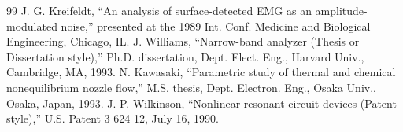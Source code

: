 \documentclass[letterpaper, 10 pt, conference]{ieeeconf}  %
\begin{document}
\begin{thebibliography}{99}
 J. G. Kreifeldt, “An analysis of surface-detected EMG as an amplitude-modulated noise,” presented at the 1989 Int. Conf. Medicine and Biological Engineering, Chicago, IL.
 J. Williams, “Narrow-band analyzer (Thesis or Dissertation style),” Ph.D. dissertation, Dept. Elect. Eng., Harvard Univ., Cambridge, MA, 1993. 
 N. Kawasaki, “Parametric study of thermal and chemical nonequilibrium nozzle flow,” M.S. thesis, Dept. Electron. Eng., Osaka Univ., Osaka, Japan, 1993.
 J. P. Wilkinson, “Nonlinear resonant circuit devices (Patent style),” U.S. Patent 3 624 12, July 16, 1990. 






\end{thebibliography}
\end{document}
